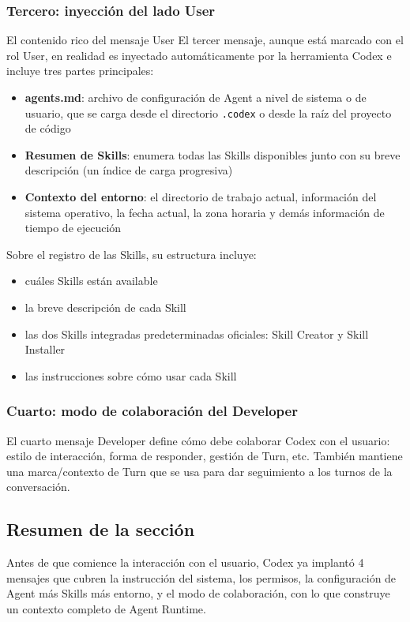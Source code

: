 \subsubsection{Tercero: inyección del lado User}

\begin{knowledgebox}{El contenido rico del mensaje User}
El tercer mensaje, aunque está marcado con el rol User, en realidad es inyectado automáticamente por la herramienta Codex e incluye tres partes principales:
\begin{itemize}
    \item \textbf{agents.md}: archivo de configuración de Agent a nivel de sistema o de usuario, que se carga desde el directorio \texttt{.codex} o desde la raíz del proyecto de código
    \item \textbf{Resumen de Skills}: enumera todas las Skills disponibles junto con su breve descripción (un índice de carga progresiva)
    \item \textbf{Contexto del entorno}: el directorio de trabajo actual, información del sistema operativo, la fecha actual, la zona horaria y demás información de tiempo de ejecución
\end{itemize}
\end{knowledgebox}

Sobre el registro de las Skills, su estructura incluye:
\begin{itemize}
    \item cuáles Skills están available
    \item la breve descripción de cada Skill
    \item las dos Skills integradas predeterminadas oficiales: Skill Creator y Skill Installer
    \item las instrucciones sobre cómo usar cada Skill
\end{itemize}

\subsubsection{Cuarto: modo de colaboración del Developer}

El cuarto mensaje Developer define cómo debe colaborar Codex con el usuario: estilo de interacción, forma de responder, gestión de Turn, etc. También mantiene una marca/contexto de Turn que se usa para dar seguimiento a los turnos de la conversación.

\subsection{Resumen de la sección}

Antes de que comience la interacción con el usuario, Codex ya implantó 4 mensajes que cubren la instrucción del sistema, los permisos, la configuración de Agent más Skills más entorno, y el modo de colaboración, con lo que construye un contexto completo de Agent Runtime.
